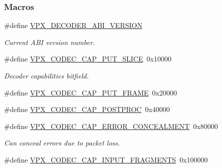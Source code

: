 \subsubsection*{Macros}
\begin{DoxyCompactItemize}
\item 
\#define \hyperlink{group__decoder_ga462b459e7ae13937e1eae1776245db12}{V\+P\+X\+\_\+\+D\+E\+C\+O\+D\+E\+R\+\_\+\+A\+B\+I\+\_\+\+V\+E\+R\+S\+I\+ON}\hypertarget{group__decoder_ga462b459e7ae13937e1eae1776245db12}{}\label{group__decoder_ga462b459e7ae13937e1eae1776245db12}

\begin{DoxyCompactList}\small\item\em Current A\+BI version number. \end{DoxyCompactList}\item 
\#define \hyperlink{group__decoder_ga9e33b8ee81025d5fc3d01b0975ad5f96}{V\+P\+X\+\_\+\+C\+O\+D\+E\+C\+\_\+\+C\+A\+P\+\_\+\+P\+U\+T\+\_\+\+S\+L\+I\+CE}~0x10000
\begin{DoxyCompactList}\small\item\em Decoder capabilities bitfield. \end{DoxyCompactList}\item 
\#define \hyperlink{group__decoder_ga0ef59ca8067ac1dc8c8378042277ccc8}{V\+P\+X\+\_\+\+C\+O\+D\+E\+C\+\_\+\+C\+A\+P\+\_\+\+P\+U\+T\+\_\+\+F\+R\+A\+ME}~0x20000
\item 
\#define \hyperlink{group__decoder_ga7825ade982ab85a5583d3d8a669baa3b}{V\+P\+X\+\_\+\+C\+O\+D\+E\+C\+\_\+\+C\+A\+P\+\_\+\+P\+O\+S\+T\+P\+R\+OC}~0x40000
\item 
\#define \hyperlink{group__decoder_gac44cd9e4722e1eb32a37c3eaec8d97b9}{V\+P\+X\+\_\+\+C\+O\+D\+E\+C\+\_\+\+C\+A\+P\+\_\+\+E\+R\+R\+O\+R\+\_\+\+C\+O\+N\+C\+E\+A\+L\+M\+E\+NT}~0x80000\hypertarget{group__decoder_gac44cd9e4722e1eb32a37c3eaec8d97b9}{}\label{group__decoder_gac44cd9e4722e1eb32a37c3eaec8d97b9}

\begin{DoxyCompactList}\small\item\em Can conceal errors due to packet loss. \end{DoxyCompactList}\item 
\#define \hyperlink{group__decoder_gae89cbd3e8089803c6f4a67fc67a8c531}{V\+P\+X\+\_\+\+C\+O\+D\+E\+C\+\_\+\+C\+A\+P\+\_\+\+I\+N\+P\+U\+T\+\_\+\+F\+R\+A\+G\+M\+E\+N\+TS}~0x100000\hypertarget{group__decoder_gae89cbd3e8089803c6f4a67fc67a8c531}{}\label{group__decoder_gae89cbd3e8089803c6f4a67fc67a8c531}


\end{DoxyCompactItemize}
